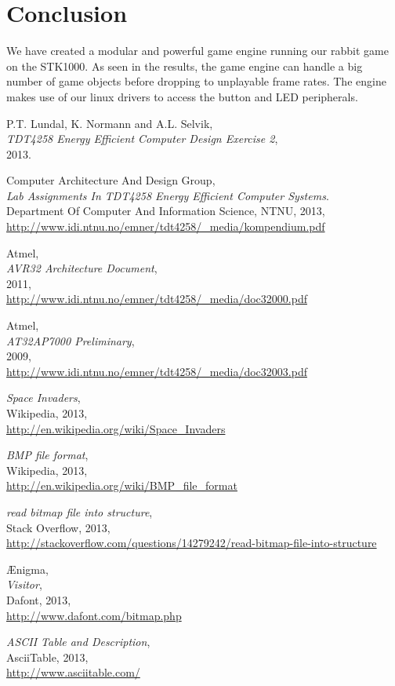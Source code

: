 \documentclass[a4paper,12pt]{article}
\begin{document}
\clearpage
\section{Conclusion}

We have created a modular and powerful game engine running our rabbit game on the STK1000. As seen in the results, the game engine can handle a big number of game objects before dropping to unplayable frame rates. The engine makes use of our linux drivers to access the button and LED peripherals.

\clearpage
\begin{thebibliography}{9}

P.T. Lundal, K. Normann and A.L. Selvik,\\
\emph{TDT4258 Energy Efficient Computer Design Exercise 2},\\
2013.

Computer Architecture And Design Group, \\
\emph{Lab Assignments In TDT4258 Energy Efficient Computer Systems}.\\
Department Of Computer And Information Science, NTNU, 2013,\\
\url{http://www.idi.ntnu.no/emner/tdt4258/_media/kompendium.pdf}

Atmel, \\
\emph{AVR32 Architecture Document},\\
2011,\\
\url{http://www.idi.ntnu.no/emner/tdt4258/_media/doc32000.pdf}

Atmel,\\
\emph{AT32AP7000 Preliminary},\\
2009,\\
\url{http://www.idi.ntnu.no/emner/tdt4258/_media/doc32003.pdf}

\emph{Space Invaders},\\
Wikipedia, 2013,\\
\url{http://en.wikipedia.org/wiki/Space_Invaders}

\emph{BMP file format},\\
Wikipedia, 2013,\\
\url{http://en.wikipedia.org/wiki/BMP_file_format}

\emph{read bitmap file into structure},\\
Stack Overflow, 2013,\\
\url{http://stackoverflow.com/questions/14279242/read-bitmap-file-into-structure}

Ænigma,\\
\emph{Visitor},\\
Dafont, 2013,\\
\url{http://www.dafont.com/bitmap.php}

\emph{ASCII Table and Description},\\
AsciiTable, 2013,\\
\url{http://www.asciitable.com/}

\end{thebibliography}
\end{document}

